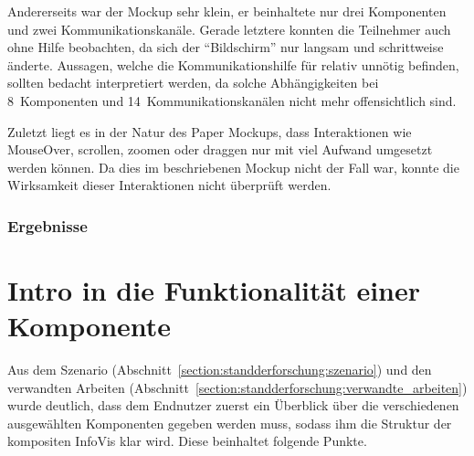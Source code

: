 \documentclass[
	headsepline,
	footsepline,
	fontsize=12pt,
	bibliography=totoc
]{scrbook}
\begin{document}
Andererseits war der Mockup sehr klein, er beinhaltete nur drei Komponenten und zwei Kommunikationskanäle. Gerade letztere konnten die Teilnehmer auch ohne Hilfe beobachten, da sich der \enquote{Bildschirm} nur langsam und schrittweise änderte. Aussagen, welche die Kommunikationshilfe für relativ unnötig befinden, sollten bedacht interpretiert werden, da solche Abhängigkeiten bei 8~Komponenten und 14~Kommunikationskanälen nicht mehr offensichtlich sind.

Zuletzt liegt es in der Natur des Paper Mockups, dass Interaktionen wie MouseOver, scrollen, zoomen oder draggen nur mit viel Aufwand umgesetzt werden können. Da dies im beschriebenen Mockup nicht der Fall war, konnte die Wirksamkeit dieser Interaktionen nicht überprüft werden.

\subsubsection{Ergebnisse}


\section{Intro in die Funktionalität einer Komponente}
\label{section:konzeption:intro}

Aus dem Szenario (Abschnitt~\ref{section:standderforschung:szenario}) und den verwandten Arbeiten (Abschnitt~\ref{section:standderforschung:verwandte_arbeiten}) wurde deutlich, dass dem Endnutzer zuerst ein Überblick über die verschiedenen ausgewählten Komponenten gegeben werden muss, sodass ihm die Struktur der kompositen InfoVis klar wird. Diese beinhaltet folgende Punkte.

\end{document}
